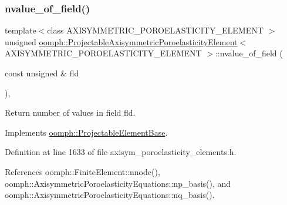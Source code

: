 \subsubsection{\texorpdfstring{nvalue\+\_\+of\+\_\+field()}{nvalue\_of\_field()}}
{\footnotesize\ttfamily template$<$class A\+X\+I\+S\+Y\+M\+M\+E\+T\+R\+I\+C\+\_\+\+P\+O\+R\+O\+E\+L\+A\+S\+T\+I\+C\+I\+T\+Y\+\_\+\+E\+L\+E\+M\+E\+NT $>$ \\
unsigned \hyperlink{classoomph_1_1ProjectableAxisymmetricPoroelasticityElement}{oomph\+::\+Projectable\+Axisymmetric\+Poroelasticity\+Element}$<$ A\+X\+I\+S\+Y\+M\+M\+E\+T\+R\+I\+C\+\_\+\+P\+O\+R\+O\+E\+L\+A\+S\+T\+I\+C\+I\+T\+Y\+\_\+\+E\+L\+E\+M\+E\+NT $>$\+::nvalue\+\_\+of\+\_\+field (\begin{DoxyParamCaption}\item[{const unsigned \&}]{fld }\end{DoxyParamCaption})\hspace{0.3cm}{\ttfamily [inline]}, {\ttfamily [virtual]}}



Return number of values in field fld. 



Implements \hyperlink{classoomph_1_1ProjectableElementBase_a1a9a6de16f3511bca8e8be770abb9c2e}{oomph\+::\+Projectable\+Element\+Base}.



Definition at line 1633 of file axisym\+\_\+poroelasticity\+\_\+elements.\+h.



References oomph\+::\+Finite\+Element\+::nnode(), oomph\+::\+Axisymmetric\+Poroelasticity\+Equations\+::np\+\_\+basis(), and oomph\+::\+Axisymmetric\+Poroelasticity\+Equations\+::nq\+\_\+basis().

\mbox{\label{classoomph_1_1ProjectableAxisymmetricPoroelasticityElement_af234691b4a8de7ac8e0b786d94c0fdab}} 
